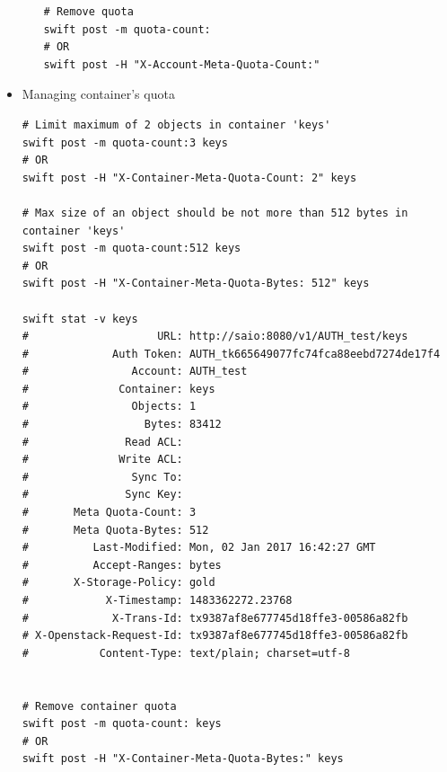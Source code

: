 \documentclass{article}
\begin{document}
\begin{itemize}
\begin{itemize}
\begin{verbatim}
# Remove quota
swift post -m quota-count:
# OR
swift post -H "X-Account-Meta-Quota-Count:"
\end{verbatim}
\end{itemize}

\item Managing container's quota

\begin{verbatim}
# Limit maximum of 2 objects in container 'keys'
swift post -m quota-count:3 keys
# OR
swift post -H "X-Container-Meta-Quota-Count: 2" keys

# Max size of an object should be not more than 512 bytes in container 'keys'
swift post -m quota-count:512 keys
# OR
swift post -H "X-Container-Meta-Quota-Bytes: 512" keys

swift stat -v keys
#                    URL: http://saio:8080/v1/AUTH_test/keys
#             Auth Token: AUTH_tk665649077fc74fca88eebd7274de17f4
#                Account: AUTH_test
#              Container: keys
#                Objects: 1
#                  Bytes: 83412
#               Read ACL:
#              Write ACL:
#                Sync To:
#               Sync Key:
#       Meta Quota-Count: 3
#       Meta Quota-Bytes: 512
#          Last-Modified: Mon, 02 Jan 2017 16:42:27 GMT
#          Accept-Ranges: bytes
#       X-Storage-Policy: gold
#            X-Timestamp: 1483362272.23768
#             X-Trans-Id: tx9387af8e677745d18ffe3-00586a82fb
# X-Openstack-Request-Id: tx9387af8e677745d18ffe3-00586a82fb
#           Content-Type: text/plain; charset=utf-8


# Remove container quota
swift post -m quota-count: keys
# OR
swift post -H "X-Container-Meta-Quota-Bytes:" keys
\end{verbatim}
\end{itemize}
\end{document}
